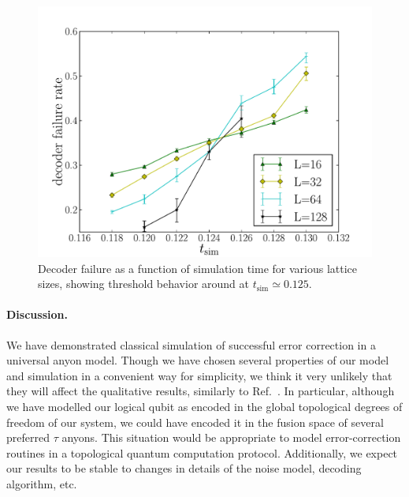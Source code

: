 \documentclass[aps, prl, letterpaper, twocolumn, superscriptaddress, notitlepage, 10pt]{revtex4-1}
\begin{document}
\begin{figure}[th!]
\begin{center}
	\includegraphics[width=\columnwidth]{anyons-kyle.pdf}
\caption{Decoder failure as a function of simulation time for various lattice sizes, showing threshold behavior around at $t_{\mathrm{sim}}\simeq 0.125$.}
\label{f:threshold}
\end{center}
\end{figure}


	

\paragraph{Discussion.}

	We have demonstrated classical simulation of successful error correction in a universal anyon model. Though we have chosen several properties of our model and simulation in a convenient way for simplicity, we think it very unlikely that they will affect the qualitative results, similarly to Ref.~\cite{Brell2013}. In particular, although we have modelled our logical qubit as encoded in the global topological degrees of freedom of our system, we could have encoded it in the fusion space of several preferred $\tau$ anyons. This situation would be appropriate to model error-correction routines in a topological quantum computation protocol. Additionally, we expect our results to be stable to changes in details of the noise model, decoding algorithm, etc.
	
\end{document}
